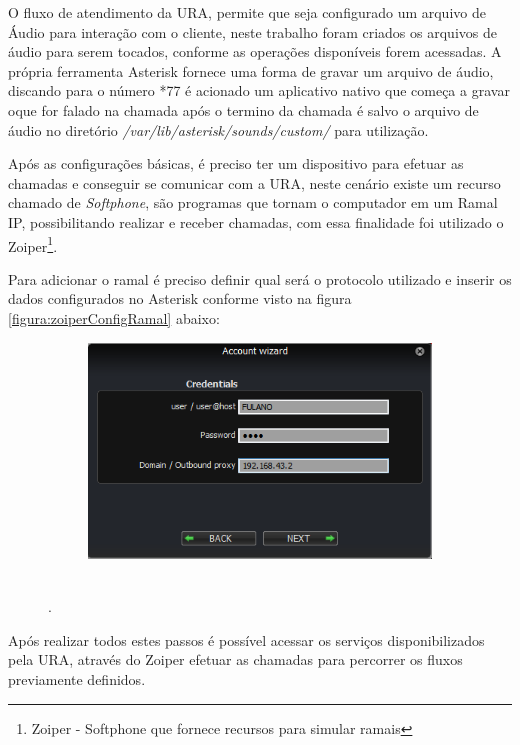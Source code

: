 O fluxo de atendimento da URA, permite que seja configurado um arquivo de Áudio para interação com o cliente, neste trabalho foram criados os arquivos de áudio para serem tocados, conforme as operações disponíveis forem acessadas.
A própria ferramenta Asterisk fornece uma forma de gravar um arquivo de áudio, discando para o número *77 é acionado um aplicativo nativo que começa a gravar oque for falado na chamada após o termino da chamada é salvo o arquivo de áudio no diretório \textit{/var/lib/asterisk/sounds/custom/} para utilização.
 
Após as configurações básicas, é preciso ter um dispositivo para efetuar as chamadas e conseguir se comunicar com a URA, neste cenário existe um recurso chamado de \textit{Softphone}, são programas que tornam o computador em um Ramal IP, possibilitando realizar e receber chamadas, com essa finalidade foi utilizado o Zoiper\footnote{Zoiper - Softphone que fornece recursos para simular ramais}.

Para adicionar o ramal é preciso definir qual será o protocolo utilizado e inserir os dados configurados no Asterisk conforme visto na figura \ref{figura:zoiperConfigRamal} abaixo:

\begin{figure}[H]
	\caption{\textbf{Configurar Ramal no Zoiper}}
	\label{figura:zoiperConfigRamal}
	\begin{subfigure}[H]{\textwidth}
		\centering
		\includegraphics{figuras/configurar_ramal_zoiper.png}
	\end{subfigure}
	\\[6pt]
	\fontsize{10}{12}\selectfont {Fonte: Autoria Própria}.
\end{figure}


Após realizar todos estes passos é possível acessar os serviços disponibilizados pela URA, através do Zoiper efetuar as chamadas para percorrer os fluxos previamente definidos.